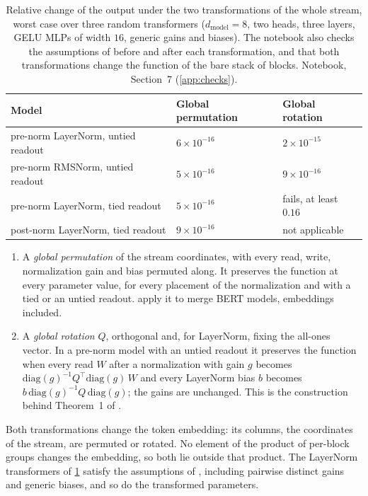 \documentclass[10pt]{article}
\theoremstyle{definition}
\theoremstyle{remark}
\newcommand{\dm}{d_{\mathrm{model}}}
\begin{document}
\begin{table}[ht]
\centering\small
\caption{Relative change of the output under the two transformations of the whole stream, worst case over three random transformers ($\dm = 8$, two heads, three layers, GELU MLPs of width $16$, generic gains and biases). The notebook also checks the assumptions of \citet{wang2025gauge} before and after each transformation, and that both transformations change the function of the bare stack of blocks. Notebook, Section~7 (\cref{app:checks}).}
\label{tab:product}
\begin{tabular}{lll}
\toprule
Model & Global permutation & Global rotation \\
\midrule
pre-norm LayerNorm, untied readout & $6\times10^{-16}$ & $2\times10^{-15}$ \\
pre-norm RMSNorm, untied readout & $5\times10^{-16}$ & $9\times10^{-16}$ \\
pre-norm LayerNorm, tied readout & $5\times10^{-16}$ & fails, at least $0.16$ \\
post-norm LayerNorm, tied readout & $9\times10^{-16}$ & not applicable \\
\bottomrule
\end{tabular}
\end{table}

\begin{enumerate}
\item A \emph{global permutation} of the stream coordinates, with every read, write, normalization gain and bias permuted along. It preserves the function at every parameter value, for every placement of the normalization and with a tied or an untied readout. \citet[Section~3.3]{verma2024merging} apply it to merge BERT models, embeddings included.
\item A \emph{global rotation} $Q$, orthogonal and, for LayerNorm, fixing the all-ones vector. In a pre-norm model with an untied readout it preserves the function when every read $W$ after a normalization with gain $g$ becomes $\mathrm{diag}(g)^{-1}Q^\top\mathrm{diag}(g)\,W$ and every LayerNorm bias $b$ becomes $b\,\mathrm{diag}(g)^{-1}Q\,\mathrm{diag}(g)$; the gains are unchanged. This is the construction behind Theorem~1 of \citet{ashkboos2024slicegpt}.
\end{enumerate}
Both transformations change the token embedding: its columns, the coordinates of the stream, are permuted or rotated. No element of the product of per-block groups changes the embedding, so both lie outside that product. The LayerNorm transformers of \cref{tab:product} satisfy the assumptions of \citet{wang2025gauge}, including pairwise distinct gains and generic biases, and so do the transformed parameters.
\end{document}

